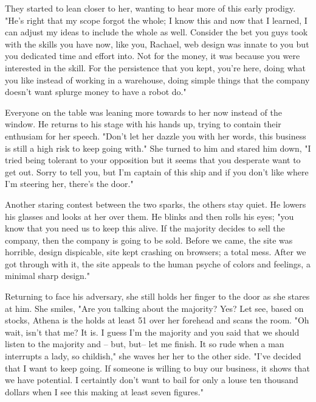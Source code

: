         They started to lean closer to her, wanting to hear more of this early prodigy. "He's right that my scope forgot the whole; I know this
    and now that I learned, I can adjust my ideas to include the whole as well. Consider the bet you guys took with the skills you have now,
    like you, Rachael, web design was innate to you but you dedicated time and effort into. Not for the money, it was because you were interested
    in the skill. For the persistence that you kept, you're here, doing what you like instead of working in a warehouse, doing simple things
    that the company doesn't want splurge money to have a robot do."

        Everyone on the table was leaning more towards to her now instead of the window. He returns to his stage with his hands up, trying to
    contain their enthusiam for her speech. "Don't let her dazzle you with her words, this business is still a high risk to keep going with."
    She turned to him and stared him down, "I tried being tolerant to your opposition but it seems that you desperate want to get out. Sorry
    to tell you, but I'm captain of this ship and if you don't like where I'm steering her, there's the door."

        Another staring contest between the two sparks, the others stay quiet. He lowers his glasses and looks at her over them. He blinks and
    then rolls his eyes; "you know that you need us to keep this alive. If the majority decides to sell the company, then the company is going
    to be sold. Before we came, the site was horrible, design dispicable, site kept crashing on browsers; a total mess. After we got through
    with it, the site appeals to the human psyche of colors and feelings, a minimal sharp design."

        Returning to face his adversary, she still holds her finger to the door as she stares at him. She smiles, "Are you talking about the
    majority? Yes? Let see, based on stocks, Athena is the holds at least 51%
    over her forehead and scans the room. "Oh wait, isn't that me? It is. I guess I'm the majority and you said that we should listen to the
    majority and -- but, but-- let me finish. It so rude when a man interrupts a lady, so childish," she waves her her to the other side. 
    "I've decided that I want to keep going. If someone is willing to buy our business, it shows that we have potential. I certaintly don't want
    to bail for only a louse ten thousand dollars when I see this making at least seven figures."

